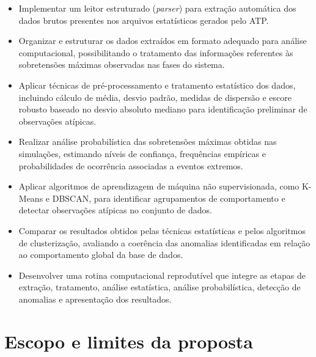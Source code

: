 \documentclass[
	12pt,				%
	openright,			%
	oneside,			%
	a4paper,			%
	chapter=TITLE,		%
	section=TITLE,		%
	subsection=TITLE,	%
	subsubsection=TITLE,%
	english,			%
	brazilian			%
	]{abntex2}
\theoremstyle{definition}
\begin{document}
\begin{itemize}
\item Implementar um leitor estruturado (\textit{parser}) para extração automática dos dados brutos presentes nos arquivos estatísticos gerados pelo ATP.


\item Organizar e estruturar os dados extraídos em formato adequado para análise computacional, possibilitando o tratamento das informações referentes às sobretensões máximas observadas nas fases do sistema.

\item Aplicar técnicas de pré-processamento e tratamento estatístico dos dados, incluindo cálculo de média, desvio padrão, medidas de dispersão e escore robusto baseado no desvio absoluto mediano para identificação preliminar de observações atípicas.

\item Realizar análise probabilística das sobretensões máximas obtidas nas simulações, estimando níveis de confiança, frequências empíricas e probabilidades de ocorrência associadas a eventos extremos.

\item Aplicar algoritmos de aprendizagem de máquina não supervisionada, como K-Means e DBSCAN, para identificar agrupamentos de comportamento e detectar observações atípicas no conjunto de dados.

\item Comparar os resultados obtidos pelas técnicas estatísticas e pelos algoritmos de clusterização, avaliando a coerência das anomalias identificadas em relação ao comportamento global da base de dados.

\item Desenvolver uma rotina computacional reprodutível que integre as etapas de extração, tratamento, análise estatística, análise probabilística, detecção de anomalias e apresentação dos resultados.


\end{itemize}

\section{Escopo e limites da proposta}
\label{sec:escopo-limites}

\end{document}
